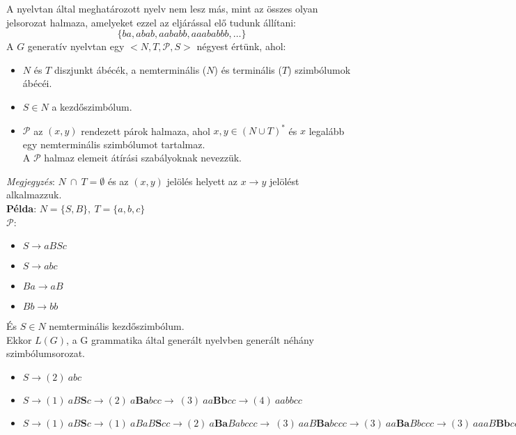 \documentclass[12pt,margin=0px]{article}
\begin{document}
    \noindent A nyelvtan által meghatározott nyelv nem lesz más, mint az összes olyan jelsorozat halmaza, amelyeket ezzel az eljárással elő tudunk állítani:
    \[
        \Big\{ba, abab, aababb, aaababbb, \ldots \Big\}
    \]
\newpage
	\noindent A $G$ generatív nyelvtan egy $\Big<N,T,\mathcal{P},S\Big>$ négyest értünk, ahol:
	\begin{itemize}
		\item $N$ és $T$ diszjunkt ábécék, a nemterminális ($N$) és terminális ($T$) szimbólumok ábécéi.
		\item $S\in N$ a kezdőszimbólum.
		\item $\mathcal{P}$ az $(x,y)$ rendezett párok halmaza, ahol $x,y \in (N \cup T)^*$ és $x$ legalább egy nemterminális szimbólumot tartalmaz. \\
		      A $\mathcal{P}$ halmaz elemeit átírási szabályoknak nevezzük.\\
	\end{itemize}

    \noindent \emph{Megjegyzés}: $N\ \cap\ T = \emptyset$ és az $(x,y)$ jelölés helyett az $x \rightarrow y$ jelölést alkalmazzuk.\\

    \noindent \textbf{Példa}: $N = \Big\{S, B\Big\},\ T = \Big\{a, b, c\Big\}$\\
    $\mathcal{P}$:
    \begin{itemize}
        \item[(1)] $S \to aBSc$
        \item[(2)] $S \to abc$
        \item[(3)] $Ba \to aB$
        \item[(4)] $Bb \to bb$
    \end{itemize}
    És $S \in N$ nemterminális kezdőszimbólum.\\

    \noindent Ekkor $L(G)$, a G grammatika által generált nyelvben generált néhány szimbólumsorozat.
    \begin{itemize}
        \small
        \item[] $S \to (2)\ abc$
        \item[] $S \to (1)\ aB\textbf{S}c \to (2)\ a\textbf{Ba}bcc \to\ (3)\ aa\textbf{Bb}cc \to (4)\ aabbcc$
        \item[] $S \to (1)\ aB\textbf{S}c \to (1)\ aBaB\textbf{S}cc \to (2)\ a\textbf{Ba}Babccc \to\ (3)\ aaB\textbf{Ba}bccc \to (3)\ aa\textbf{Ba}Bbccc \to (3)\ aaaB\textbf{Bb}ccc \to (4)\ aaa\textbf{Bb}bccc \to (4)\ aaabbbccc$
    \end{itemize}
\end{document}

